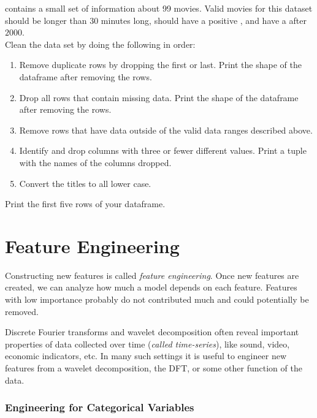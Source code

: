 \begin{problem}
 contains a small set of information about 99 movies. Valid movies for this dataset should be longer than $30$ minutes long, should have a positive , and have a  after $2000$.
\\

\noindent Clean the data set by doing the following in order: 

\begin{enumerate}

 \item Remove duplicate rows by dropping the first or last. Print the shape of the dataframe after removing the rows.

 \item Drop all rows that contain missing data. Print the shape of the dataframe after removing the rows.

 \item Remove rows that have data outside of the valid data ranges described above.
 
 \item Identify and drop columns with three or fewer different values. Print a tuple with the names of the columns dropped.

 \item Convert the titles to all lower case.

\end{enumerate}
Print the first five rows of your dataframe.
\end{problem}

\section*{Feature Engineering}

Constructing new features is called \emph{feature engineering}.
Once new features are created, we can analyze how much a model depends on each feature. 
Features with low importance probably do not contributed much and could potentially be removed.

Discrete Fourier transforms and wavelet decomposition often reveal important properties of data collected over time (\emph{called time-series}), like sound, video, economic indicators, etc.  In many such settings it is useful to engineer new features from a  wavelet decomposition, the DFT, or some other function of the data.

\subsubsection{Engineering for Categorical Variables}

